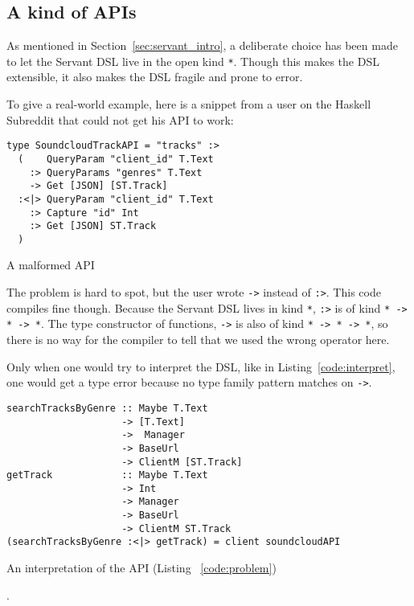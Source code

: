 \documentclass[12pt,a4paper]{article}
\begin{document}
\subsection{A kind of APIs}
As mentioned in Section~\ref{sec:servant_intro}, a deliberate choice has been made to let the Servant DSL live in the open kind \texttt{*}. Though this makes the DSL extensible, it also makes the DSL fragile and prone to error.

To give a real-world example, here is a snippet from a user on the Haskell Subreddit that could not get his API to work:

\begin{listing}[H]
\begin{verbatim}
type SoundcloudTrackAPI = "tracks" :> 
  (    QueryParam "client_id" T.Text 
    :> QueryParams "genres" T.Text
    -> Get [JSON] [ST.Track] 
  :<|> QueryParam "client_id" T.Text
    :> Capture "id" Int
    :> Get [JSON] ST.Track
  )
\end{verbatim}
\caption{A malformed API}
\label{code:problem}
\end{listing}

The problem is hard to spot, but the user wrote \texttt{->} instead of \texttt{:>}.  This code compiles fine though. Because the Servant DSL lives in kind \texttt{*}, \texttt{:>} is of kind \texttt{* -> * -> *}. The type constructor of functions, \texttt{->} is also of kind \texttt{* -> * -> *}, so there is no way for the compiler to tell that we used the wrong operator here. 

Only when one would try to interpret the DSL, like in Listing~\ref{code:interpret}, one would get a type error because no type family pattern matches on \texttt{->}.

\begin{listing}
\begin{verbatim}
searchTracksByGenre :: Maybe T.Text 
                    -> [T.Text]
                    ->  Manager
                    -> BaseUrl
                    -> ClientM [ST.Track]
getTrack            :: Maybe T.Text
                    -> Int
                    -> Manager
                    -> BaseUrl
                    -> ClientM ST.Track
(searchTracksByGenre :<|> getTrack) = client soundcloudAPI 
\end{verbatim}
  \caption{An interpretation of the API (Listing ~\ref{code:problem})}
  \label{code:interpret}.
\end{listing}
\end{document}

